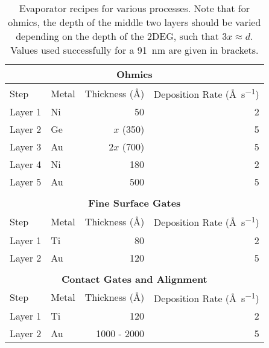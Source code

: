 \begin{table}
    \centering
    \begin{tabular}{llrr}
        \multicolumn{4}{c}{\textbf{Ohmics}}\\
        \toprule
        Step & Metal & Thickness (\si{\angstrom}) & Deposition Rate (\si{\angstrom\per\second}) \\
        \midrule
        Layer 1 & Ni & 50          & 2 \\
        Layer 2 & Ge & $x$  (350)  & 5 \\
        Layer 3 & Au & $2x$ (700)  & 5 \\
        Layer 4 & Ni & 180         & 2 \\
        Layer 5 & Au & 500  & 5 \\
        \bottomrule \\

        \multicolumn{4}{c}{\textbf{Fine Surface Gates}}\\
        \toprule
        Step & Metal & Thickness (\si{\angstrom}) & Deposition Rate (\si{\angstrom\per\second}) \\
        \midrule
        Layer 1 & Ti & 80  & 2 \\
        Layer 2 & Au & 120 & 5 \\
        \bottomrule \\

        \multicolumn{4}{c}{\textbf{Contact Gates and Alignment}}\\
        \toprule
        Step & Metal & Thickness (\si{\angstrom}) & Deposition Rate (\si{\angstrom\per\second}) \\
        \midrule
        Layer 1 & Ti & 120         & 2 \\
        Layer 2 & Au & 1000 - 2000 & 5 \\
        \bottomrule
    \end{tabular}
    \caption[Evaporator recipes]
    {Evaporator recipes for various processes. Note that for ohmics, the depth of the middle two layers should be varied
    depending on the depth of the 2DEG, such that $3x \approx d$. Values used successfully for a \SI{91}{\nano\meter} are given
    in brackets.
    }
    \label{tab:evap}
\end{table}




